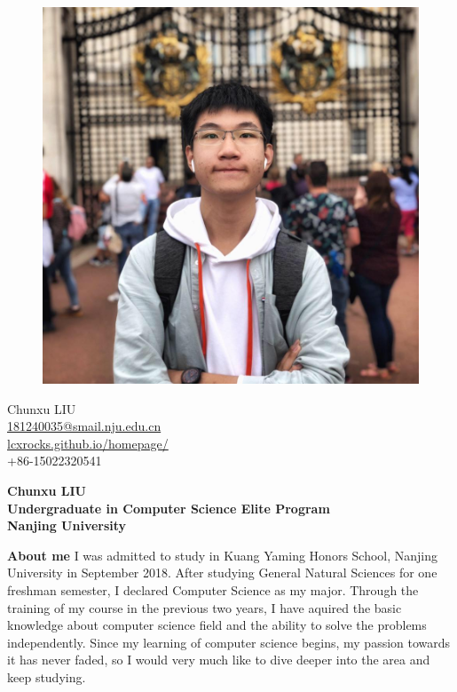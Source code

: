 \documentclass[a4paper,12pt,final]{memoir}
\newcommand{\Sep}{\vspace{1.5em}}
\newenvironment{AboutMe}
	{\ignorespaces\textbf{\color{RoyalBlue} About me}}
	{\Sep\ignorespacesafterend}
\begin{document}
%
\begin{figure}
	\hfill
	\includegraphics[width=0.8\columnwidth]{photo.jpg}
	\vspace{2cm}
\end{figure}

\begin{flushright}\small
	Chunxu LIU \\
	\url{181240035@smail.nju.edu.cn}  \\
	\url{lcxrocks.github.io/homepage/} \\
	+86-15022320541
\end{flushright}\normalsize
\framebreak


\Huge\bfseries {\color{RoyalBlue} Chunxu LIU} \\
\Large\bfseries  Undergraduate in Computer Science Elite Program \\Nanjing University \\

\normalsize\normalfont

\begin{AboutMe}
	I was admitted to study in Kuang Yaming Honors School, Nanjing University in September 2018. After studying General Natural Sciences for one freshman semester, I declared Computer Science as my major. Through the training of my course in the previous two years, I have aquired the basic knowledge about computer science field and the ability to solve the problems independently. Since my learning of computer science begins, my passion towards it has never faded, so I would very much like to dive deeper into the area and keep studying.
\end{AboutMe}
\end{document}
